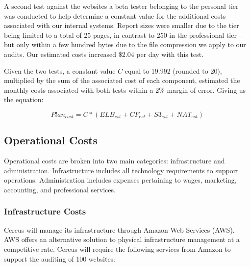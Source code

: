 A second test against the websites a beta tester belonging to the personal tier was conducted to help determine a constant value for the additional costs associated with our internal systems. Report sizes were smaller due to the tier being limited to a total of 25 pages, in contrast to 250 in the professional tier -- but only within a few hundred bytes due to the file compression we apply to our audits. Our estimated costs increased \$2.04 per day with this test.

Given the two tests, a constant value \(C\) equal to 19.992 (rounded to 20), multiplied by the sum of the associated cost of each component, estimated the monthly costs associated with both tests within a 2\% margin of error. Giving us the equation:

\[
  Plan_{cost} = C * (ELB_{est} + CF_{est} + S3_{est} + NAT_{est})
\]


\subsection{Operational Costs} \label{section.operational.costs}

Operational costs are broken into two main categories: infrastructure and administration. Infrastructure includes all technology requirements to support operations. Administration includes expenses pertaining to wages, marketing, accounting, and professional services.

\subsubsection{Infrastructure Costs} \label{infra.costs}

Cereus will manage its infrastructure through Amazon Web Services (AWS). AWS offers an alternative solution to physical infrastructure management at a competitive rate. Cereus will require the following services from Amazon to support the auditing of 100 websites:

